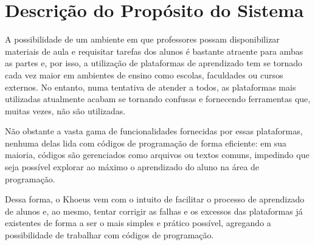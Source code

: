 \chapter{Descrição do Propósito do Sistema}
\label{sec-proposito}

A possibilidade de um ambiente em que professores possam disponibilizar materiais de aula e requisitar tarefas dos alunos é bastante atraente para ambas as partes e, por isso, a utilização de plataformas de aprendizado tem se tornado cada vez maior em ambientes de ensino como escolas, faculdades ou cursos externos. No entanto, numa tentativa de atender a todos, as plataformas mais utilizadas atualmente acabam se tornando confusas e fornecendo ferramentas que, muitas vezes, não são utilizadas.

Não obstante a vasta gama de funcionalidades fornecidas por essas plataformas, nenhuma delas lida com códigos de programação de forma eficiente: em sua maioria, códigos são gerenciados como arquivos ou textos comuns, impedindo que seja possível explorar ao máximo o aprendizado do aluno na área de programação.

Dessa forma, o Khoeus vem com o intuito de facilitar o processo de aprendizado de alunos e, ao mesmo, tentar corrigir as falhas e os excessos das plataformas já existentes de forma a ser o mais simples e prático possível, agregando a possibilidade de trabalhar com códigos de programação.